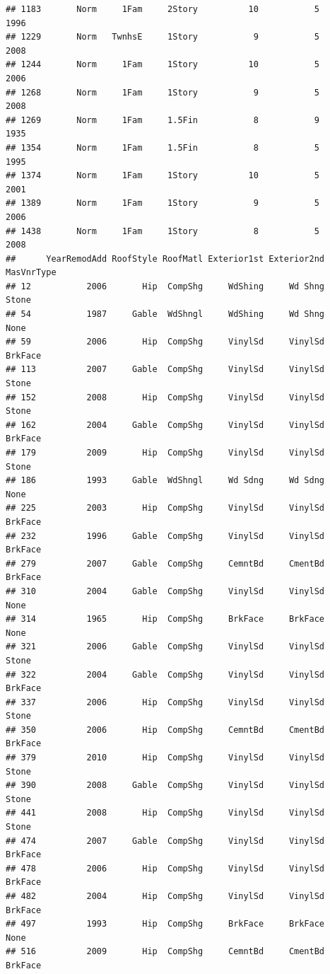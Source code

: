 \documentclass[]{article}
\begin{document}
\begin{verbatim}
## 1183       Norm     1Fam     2Story          10           5      1996
## 1229       Norm   TwnhsE     1Story           9           5      2008
## 1244       Norm     1Fam     1Story          10           5      2006
## 1268       Norm     1Fam     1Story           9           5      2008
## 1269       Norm     1Fam     1.5Fin           8           9      1935
## 1354       Norm     1Fam     1.5Fin           8           5      1995
## 1374       Norm     1Fam     1Story          10           5      2001
## 1389       Norm     1Fam     1Story           9           5      2006
## 1438       Norm     1Fam     1Story           8           5      2008
##      YearRemodAdd RoofStyle RoofMatl Exterior1st Exterior2nd MasVnrType
## 12           2006       Hip  CompShg     WdShing     Wd Shng      Stone
## 54           1987     Gable  WdShngl     WdShing     Wd Shng       None
## 59           2006       Hip  CompShg     VinylSd     VinylSd    BrkFace
## 113          2007     Gable  CompShg     VinylSd     VinylSd      Stone
## 152          2008       Hip  CompShg     VinylSd     VinylSd      Stone
## 162          2004     Gable  CompShg     VinylSd     VinylSd    BrkFace
## 179          2009       Hip  CompShg     VinylSd     VinylSd      Stone
## 186          1993     Gable  WdShngl     Wd Sdng     Wd Sdng       None
## 225          2003       Hip  CompShg     VinylSd     VinylSd    BrkFace
## 232          1996     Gable  CompShg     VinylSd     VinylSd    BrkFace
## 279          2007     Gable  CompShg     CemntBd     CmentBd    BrkFace
## 310          2004     Gable  CompShg     VinylSd     VinylSd       None
## 314          1965       Hip  CompShg     BrkFace     BrkFace       None
## 321          2006     Gable  CompShg     VinylSd     VinylSd      Stone
## 322          2004     Gable  CompShg     VinylSd     VinylSd    BrkFace
## 337          2006       Hip  CompShg     VinylSd     VinylSd      Stone
## 350          2006       Hip  CompShg     CemntBd     CmentBd    BrkFace
## 379          2010       Hip  CompShg     VinylSd     VinylSd      Stone
## 390          2008     Gable  CompShg     VinylSd     VinylSd      Stone
## 441          2008       Hip  CompShg     VinylSd     VinylSd      Stone
## 474          2007     Gable  CompShg     VinylSd     VinylSd    BrkFace
## 478          2006       Hip  CompShg     VinylSd     VinylSd    BrkFace
## 482          2004       Hip  CompShg     VinylSd     VinylSd    BrkFace
## 497          1993       Hip  CompShg     BrkFace     BrkFace       None
## 516          2009       Hip  CompShg     CemntBd     CmentBd    BrkFace

\end{verbatim}
\end{document}
